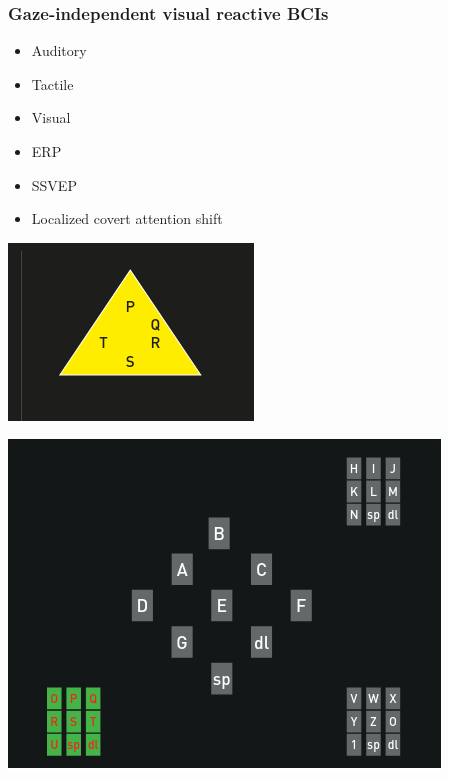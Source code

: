 \documentclass{kul-ulille-beamer}
\begin{document}
\begin{frame}[noframenumbering]
  \centering

  \frametitle{Gaze-independent visual reactive BCIs}

  \begin{minipage}{.3\textwidth}
    \footnotesize
    \begin{itemize}
      \item Auditory
      \item Tactile
      \item Visual
      \smallskip

      \item ERP
      \item SSVEP
      \item Localized covert attention shift
    \end{itemize}
  \end{minipage}\hfill%
  \begin{minipage}{.3\textwidth}
  \includegraphics[width=\textwidth]{figures/supp/feature_hexospell.png}
  \end{minipage}\hfill%
  \begin{minipage}{.3\textwidth}
  \includegraphics[width=\textwidth]{figures/supp/gibs.png}
  \end{minipage}\hfill%


\end{frame}
\end{document}
